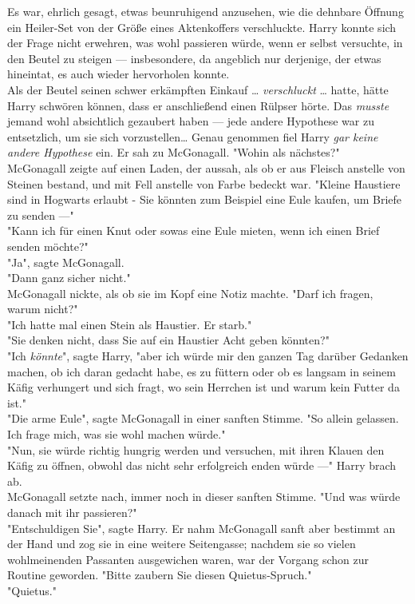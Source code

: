 {Es war, ehrlich gesagt, etwas beunruhigend anzusehen, wie die dehnbare Öffnung ein Heiler-Set von der Größe eines Aktenkoffers verschluckte. Harry konnte sich der Frage nicht erwehren, was wohl passieren würde, wenn er selbst versuchte, in den Beutel zu steigen --- insbesondere, da angeblich nur derjenige, der etwas hineintat, es auch wieder hervorholen konnte.\\ Als der Beutel seinen schwer erkämpften Einkauf … \emph{verschluckt} … hatte, hätte Harry schwören können, dass er anschließend einen Rülpser hörte. Das \emph{musste} jemand wohl absichtlich gezaubert haben --- jede andere Hypothese war zu entsetzlich, um sie sich vorzustellen… Genau genommen fiel Harry \emph{gar keine andere Hypothese} ein. Er sah zu McGonagall. "Wohin als nächstes?"\\ McGonagall zeigte auf einen Laden, der aussah, als ob er aus Fleisch anstelle von Steinen bestand, und mit Fell anstelle von Farbe bedeckt war. "Kleine Haustiere sind in Hogwarts erlaubt - Sie könnten zum Beispiel eine Eule kaufen, um Briefe zu senden ---"\\ "Kann ich für einen Knut oder sowas eine Eule mieten, wenn ich einen Brief senden möchte?"\\ "Ja", sagte McGonagall.\\ "Dann ganz sicher nicht."\\ McGonagall nickte, als ob sie im Kopf eine Notiz machte. "Darf ich fragen, warum nicht?"\\ "Ich hatte mal einen Stein als Haustier. Er starb."\\ "Sie denken nicht, dass Sie auf ein Haustier Acht geben könnten?"\\ "Ich \emph{könnte}", sagte Harry, "aber ich würde mir den ganzen Tag darüber Gedanken machen, ob ich daran gedacht habe, es zu füttern oder ob es langsam in seinem Käfig verhungert und sich fragt, wo sein Herrchen ist und warum kein Futter da ist."\\ "Die arme Eule", sagte McGonagall in einer sanften Stimme. "So allein gelassen. Ich frage mich, was sie wohl machen würde."\\ "Nun, sie würde richtig hungrig werden und versuchen, mit ihren Klauen den Käfig zu öffnen, obwohl das nicht sehr erfolgreich enden würde ---" Harry brach ab.\\ McGonagall setzte nach, immer noch in dieser sanften Stimme. "Und was würde danach mit ihr passieren?"\\ "Entschuldigen Sie", sagte Harry. Er nahm McGonagall sanft aber bestimmt an der Hand und zog sie in eine weitere Seitengasse; nachdem sie so vielen wohlmeinenden Passanten ausgewichen waren, war der Vorgang schon zur Routine geworden. "Bitte zaubern Sie diesen Quietus-Spruch."\\ "Quietus."

}
